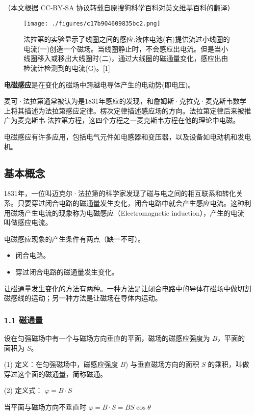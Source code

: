
（本文根据 CC-BY-SA 协议转载自原搜狗科学百科对英文维基百科的翻译）
\begin{figure}[ht]
\centering
\texttt{[image: ./figures/c17b904609835bc2.png]}
\caption{法拉第的实验显示了线圈之间的感应:液体电池(右)提供流过小线圈的电流(一)创造一个磁场。当线圈静止时，不会感应出电流。但是当小线圈移入或移出大线圈时(二)，通过大线圈的磁通量变化，感应出由检流计检测到的电流(G)。[1]} \label{fig_DCGY_1}
\end{figure}

\textbf{电磁感应}是在变化的磁场中跨越电导体产生的电动势(即电压)。

麦可·法拉第通常被认为是1831年感应的发现，和詹姆斯·克拉克·麦克斯韦数学上将其描述为法拉第感应定律。楞次定律描述感应场的方向。法拉第定律后来被推广为麦克斯韦-法拉第方程，这四个方程之一麦克斯韦方程在他的理论中电磁。

电磁感应有许多应用，包括电气元件如电感器和变压器，以及设备如电动机和发电机。
\subsection{基本概念}
1831年，一位叫迈克尔·法拉第的科学家发现了磁与电之间的相互联系和转化关系。只要穿过闭合电路的磁通量发生变化，闭合电路中就会产生感应电流。这种利用磁场产生电流的现象称为电磁感应（Electromagnetic induction），产生的电流叫做感应电流。

电磁感应现象的产生条件有两点（缺一不可）。
\begin{itemize}
\item 闭合电路。

\item 穿过闭合电路的磁通量发生变化。
\end{itemize}

让磁通量发生变化的方法有两种。一种方法是让闭合电路中的导体在磁场中做切割磁感线的运动；另一种方法是让磁场在导体内运动。
\subsubsection{1.1 磁通量}
设在匀强磁场中有一个与磁场方向垂直的平面，磁场的磁感应强度为 $ B $，平面的面积为 $S $。

(1) 定义：在匀强磁场中，磁感应强度 $ B $) 与垂直磁场方向的面积 $ S $ 的乘积，叫做穿过这个面的磁通量，简称磁通。

(2) 定义式：
$\varphi = B \cdot S$

当平面与磁场方向不垂直时
$\varphi = B \cdot S = BS \cos \theta$

